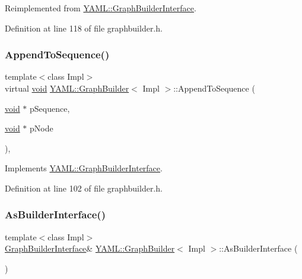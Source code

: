 Reimplemented from \mbox{\hyperlink{class_y_a_m_l_1_1_graph_builder_interface_ab742307ea6e415387e21265ea311c4b0}{Y\+A\+M\+L\+::\+Graph\+Builder\+Interface}}.



Definition at line 118 of file graphbuilder.\+h.

\mbox{\label{class_y_a_m_l_1_1_graph_builder_a50e6d0e3eed6145d9f93b0761bb67b5f}} 
\subsubsection{\texorpdfstring{AppendToSequence()}{AppendToSequence()}}
{\footnotesize\ttfamily template$<$class Impl$>$ \\
virtual \mbox{\hyperlink{glad_8h_a950fc91edb4504f62f1c577bf4727c29}{void}} \mbox{\hyperlink{class_y_a_m_l_1_1_graph_builder}{Y\+A\+M\+L\+::\+Graph\+Builder}}$<$ Impl $>$\+::Append\+To\+Sequence (\begin{DoxyParamCaption}\item[{\mbox{\hyperlink{glad_8h_a950fc91edb4504f62f1c577bf4727c29}{void}} $\ast$}]{p\+Sequence,  }\item[{\mbox{\hyperlink{glad_8h_a950fc91edb4504f62f1c577bf4727c29}{void}} $\ast$}]{p\+Node }\end{DoxyParamCaption})\hspace{0.3cm}{\ttfamily [inline]}, {\ttfamily [virtual]}}



Implements \mbox{\hyperlink{class_y_a_m_l_1_1_graph_builder_interface_ad33488cc66061b8dc506377d26912cf7}{Y\+A\+M\+L\+::\+Graph\+Builder\+Interface}}.



Definition at line 102 of file graphbuilder.\+h.

\mbox{\label{class_y_a_m_l_1_1_graph_builder_a11986f0addaf16cc02c637d16a039f78}} 
\subsubsection{\texorpdfstring{AsBuilderInterface()}{AsBuilderInterface()}}
{\footnotesize\ttfamily template$<$class Impl$>$ \\
\mbox{\hyperlink{class_y_a_m_l_1_1_graph_builder_interface}{Graph\+Builder\+Interface}}\& \mbox{\hyperlink{class_y_a_m_l_1_1_graph_builder}{Y\+A\+M\+L\+::\+Graph\+Builder}}$<$ Impl $>$\+::As\+Builder\+Interface (\begin{DoxyParamCaption}{ }\end{DoxyParamCaption})\hspace{0.3cm}{\ttfamily [inline]}}



